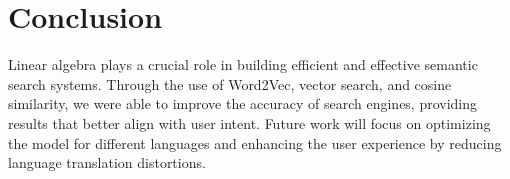 \section{Conclusion}
Linear algebra plays a crucial role in building efficient and effective semantic search systems. Through the use of Word2Vec, vector search, and cosine similarity, we were able to improve the accuracy of search engines, providing results that better align with user intent. Future work will focus on optimizing the model for different languages and enhancing the user experience by reducing language translation distortions.
